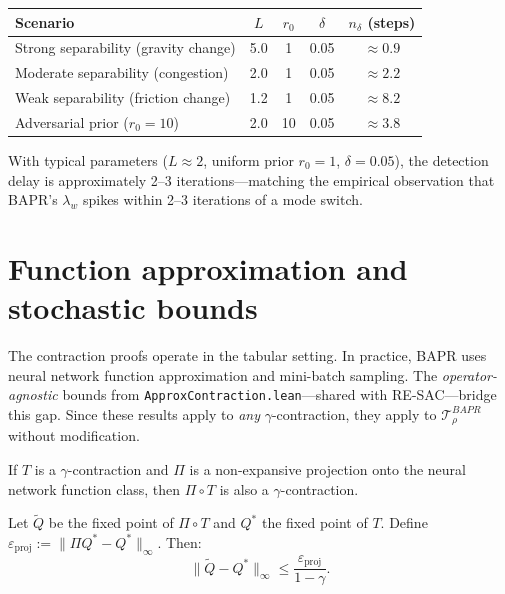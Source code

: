 \begin{center}
\begin{tabular}{lcccc}
\toprule
\textbf{Scenario} & $L$ & $r_0$ & $\delta$ & $n_\delta$ (steps) \\
\midrule
Strong separability (gravity change) & 5.0 & 1 & 0.05 & $\approx 0.9$ \\
Moderate separability (congestion) & 2.0 & 1 & 0.05 & $\approx 2.2$ \\
Weak separability (friction change) & 1.2 & 1 & 0.05 & $\approx 8.2$ \\
Adversarial prior ($r_0 = 10$) & 2.0 & 10 & 0.05 & $\approx 3.8$ \\
\bottomrule
\end{tabular}
\end{center}

\noindent With typical parameters ($L \approx 2$, uniform prior $r_0 = 1$, $\delta = 0.05$), the detection delay is approximately 2--3 iterations---matching the empirical observation that BAPR's $\lambda_w$ spikes within 2--3 iterations of a mode switch.


\section{Function approximation and stochastic bounds}
\label{app:approx_bounds}

The contraction proofs operate in the tabular setting. In practice, BAPR uses neural network function approximation and mini-batch sampling. The \emph{operator-agnostic} bounds from \texttt{ApproxContraction.lean}---shared with RE-SAC---bridge this gap. Since these results apply to \emph{any} $\gamma$-contraction, they apply to $\mathcal{T}^{BAPR}_\rho$ without modification.

\begin{theorem}
    \label{thm:proj}
    If $T$ is a $\gamma$-contraction and $\Pi$ is a non-expansive projection onto the neural network function class, then $\Pi \circ T$ is also a $\gamma$-contraction.
\end{theorem}

\begin{theorem}
    \label{thm:approx}
    Let $\tilde{Q}$ be the fixed point of $\Pi \circ T$ and $Q^*$ the fixed point of $T$. Define $\varepsilon_{\text{proj}} := \|\Pi Q^* - Q^*\|_\infty$. Then:
    \begin{equation}
        \|\tilde{Q} - Q^*\|_\infty \leq \frac{\varepsilon_{\text{proj}}}{1 - \gamma}.
    \end{equation}
\end{theorem}

